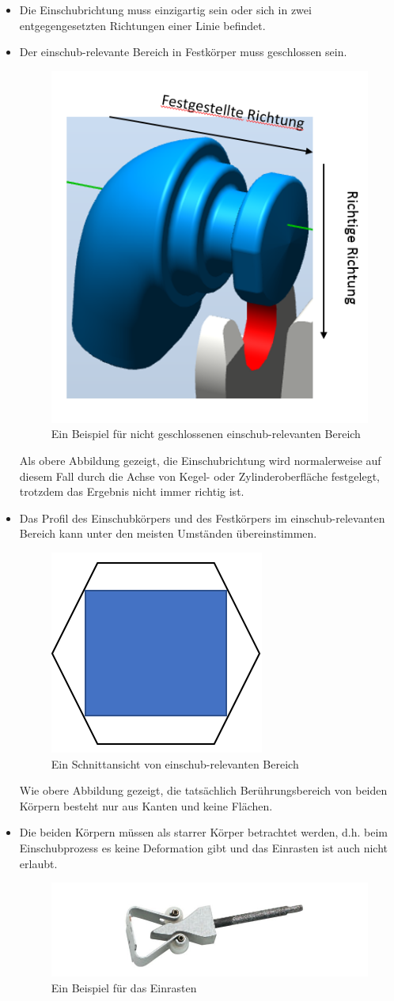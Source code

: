 \documentclass[14pt,a4paper,titlepage]{article}
\begin{document}
		\begin{itemize}
			\item Die Einschubrichtung muss einzigartig sein oder sich in zwei entgegengesetzten Richtungen einer Linie befindet.  
			\item Der einschub-relevante Bereich in Festkörper muss geschlossen sein.\\
			\begin{figure}[h!]
				\centering
				\includegraphics[width=0.3\linewidth]{notclosedarea.png}
				\caption{Ein Beispiel für nicht geschlossenen einschub-relevanten Bereich}
			\end{figure}
			Als obere Abbildung gezeigt, die Einschubrichtung wird normalerweise auf diesem Fall durch die Achse von Kegel- oder Zylinderoberfläche festgelegt, trotzdem das Ergebnis nicht immer richtig ist. 
			\item 
			Das Profil des Einschubkörpers und des Festkörpers im einschub-relevanten Bereich kann unter den meisten Umständen übereinstimmen.\\
				\begin{figure}[h!]
				\centering
				\includegraphics[width=0.3\linewidth]{differentprofile.png}
				\caption{Ein Schnittansicht von einschub-relevanten Bereich}
				\end{figure} 
			Wie obere Abbildung gezeigt, die tatsächlich Berührungsbereich von beiden Körpern besteht nur aus Kanten und keine Flächen. 
			\item Die beiden Körpern müssen als starrer Körper betrachtet werden, d.h. beim Einschubprozess es keine Deformation gibt und das Einrasten ist auch nicht erlaubt. 
			\begin{figure}[h!]
				\centering
				\includegraphics[width=0.5\linewidth]{einrasten.png}
				\caption{Ein Beispiel für das Einrasten}
			\end{figure}
		\end{itemize}
\end{document}
